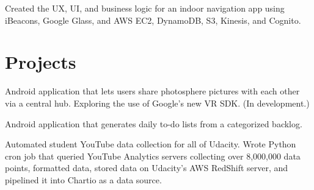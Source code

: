\documentclass[]{deedy-resume-openfont}
\begin{document}
\begin{minipage}[t]{0.66\textwidth}
\begin{tightemize}
\item Created the UX, UI, and business logic for an indoor navigation app using iBeacons, Google Glass, and AWS EC2, DynamoDB, S3, Kinesis, and Cognito.
\end{tightemize}
\sectionsep


\section{Projects}

\begin{tightemize}
\item Android application that lets users share photosphere pictures with each other via a central hub. Exploring the use of Google's new VR SDK. (In development.)
\end{tightemize}
\sectionsep

\begin{tightemize}
\item Android application that generates daily to-do lists from a categorized backlog.
\end{tightemize}
\sectionsep


\begin{tightemize}
\item Automated student YouTube data collection for all of Udacity. Wrote Python cron job that queried YouTube Analytics servers collecting over 8,000,000 data points, formatted data, stored data on Udacity's AWS RedShift server, and pipelined it into Chartio as a data source.
\end{tightemize}
\sectionsep



\end{minipage}
\end{document}

